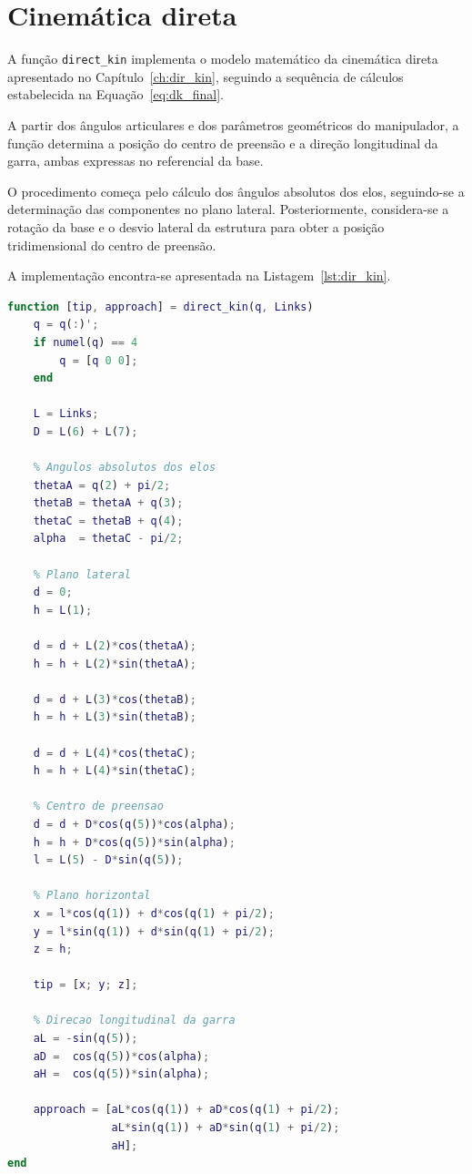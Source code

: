 
\section{Cinemática direta}
\label{sec:cin_dir}

A função \texttt{direct\_kin} implementa o modelo matemático da cinemática direta apresentado no Capítulo~\ref{ch:dir_kin}, seguindo a sequência de cálculos estabelecida na Equação~\eqref{eq:dk_final}.

A partir dos ângulos articulares e dos parâmetros geométricos do manipulador, a função determina a posição do centro de preensão e a direção longitudinal da garra, ambas expressas no referencial da base.

O procedimento começa pelo cálculo dos ângulos absolutos dos elos, seguindo-se a determinação das componentes no plano lateral. Posteriormente, considera-se a rotação da base e o desvio lateral da estrutura para obter a posição tridimensional do centro de preensão.

A implementação encontra-se apresentada na Listagem~\ref{lst:dir_kin}.

\begin{lstlisting}[language=Matlab, caption={Implementação da função direct\_kin.}, label={lst:dir_kin}]
function [tip, approach] = direct_kin(q, Links)
    q = q(:)';
    if numel(q) == 4
        q = [q 0 0];
    end

    L = Links;
    D = L(6) + L(7);

    % Angulos absolutos dos elos
    thetaA = q(2) + pi/2;
    thetaB = thetaA + q(3);
    thetaC = thetaB + q(4);
    alpha  = thetaC - pi/2;

    % Plano lateral
    d = 0;
    h = L(1);

    d = d + L(2)*cos(thetaA);
    h = h + L(2)*sin(thetaA);

    d = d + L(3)*cos(thetaB);
    h = h + L(3)*sin(thetaB);

    d = d + L(4)*cos(thetaC);
    h = h + L(4)*sin(thetaC);

    % Centro de preensao
    d = d + D*cos(q(5))*cos(alpha);
    h = h + D*cos(q(5))*sin(alpha);
    l = L(5) - D*sin(q(5));

    % Plano horizontal
    x = l*cos(q(1)) + d*cos(q(1) + pi/2);
    y = l*sin(q(1)) + d*sin(q(1) + pi/2);
    z = h;

    tip = [x; y; z];

    % Direcao longitudinal da garra
    aL = -sin(q(5));
    aD =  cos(q(5))*cos(alpha);
    aH =  cos(q(5))*sin(alpha);

    approach = [aL*cos(q(1)) + aD*cos(q(1) + pi/2);
                aL*sin(q(1)) + aD*sin(q(1) + pi/2);
                aH];
end
\end{lstlisting}

